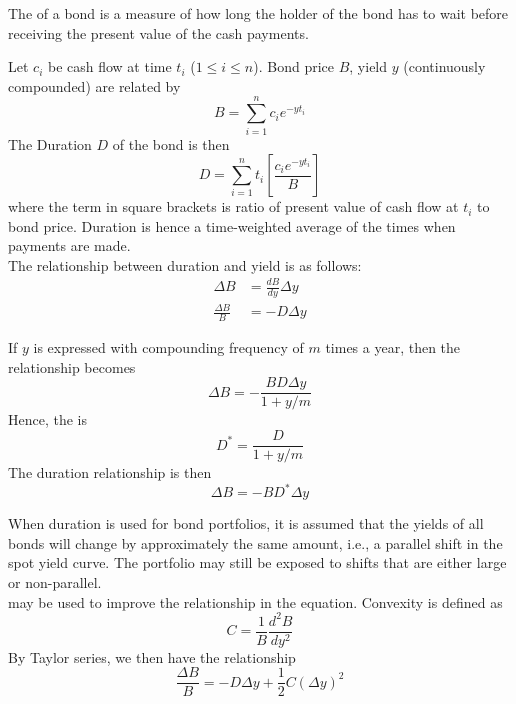 \begin{definition}
The  of a bond is a measure of how long the holder of the bond has to wait before receiving the present value of the cash payments.
\end{definition}

Let $c_i$ be cash flow at time $t_i$ ($1 \leq i \leq n$). Bond price $B$, yield $y$ (continuously compounded) are related by
\begin{equation*}
B = \sum\limits_{i=1}^n c_i e^{-y t_i} \nonumber
\end{equation*}
The Duration $D$ of the bond is then
\begin{equation*}
D = \sum\limits_{i=1}^n t_i \left[ \frac{c_i e^{-y t_i}}{B} \right] \nonumber
\end{equation*}
where the term in square brackets is ratio of present value of cash flow at $t_i$ to bond price. Duration is hence a time-weighted average of the times when payments are made.\\
The relationship between duration and yield is as follows:
\begin{align*}
\Delta B &= \frac{dB}{dy} \Delta y \nonumber \\
\frac{\Delta B}{B} &= - D \Delta y \nonumber
\end{align*}

If $y$ is expressed with compounding frequency of $m$ times a year, then the relationship becomes
\begin{equation*}
\Delta B = - \frac{BD \Delta y}{1 + y/m} \nonumber
\end{equation*}
Hence, the  is 
\begin{equation*}
D^* = \frac{D}{1 + y/m} \nonumber
\end{equation*}
The duration relationship is then
\begin{equation*}
\Delta B = - B D^* \Delta y \nonumber
\end{equation*}

When duration is used for bond portfolios, it is assumed that the yields of all bonds will change by approximately the same amount, i.e., a parallel shift in the spot yield curve. The portfolio may still be exposed to shifts that are either large or non-parallel.\\
 may be used to improve the relationship in the equation. Convexity is defined as
\begin{equation*}
C = \frac{1}{B} \frac{d^2 B}{dy^2} \nonumber
\end{equation*}
By Taylor series, we then have the relationship
\begin{equation*}
\frac{\Delta B}{B} = -D \Delta y + \frac{1}{2}C(\Delta y)^2 \nonumber
\end{equation*}

